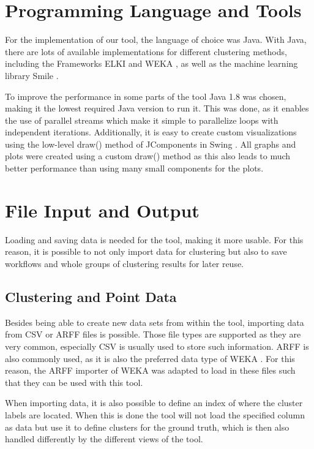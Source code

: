 \documentclass[
	a4paper,
	english,
	twoside,
	openright,               
	11pt                            
	]{report}
\begin{document}
\section{Programming Language and Tools}
For the implementation of our tool, the language of choice was Java. With Java, there are lots of available implementations for different clustering methods, including the Frameworks ELKI \cite{10.1007/978-3-540-69497-7_41} and WEKA \cite{10.1145/1656274.1656278}, as well as the machine learning library Smile \cite{javasmile}. 

To improve the performance in some parts of the tool Java 1.8 was chosen, making it the lowest required Java version to run it. This was done, as it enables the use of parallel streams which make it simple to parallelize loops with independent iterations. Additionally, it is easy to create custom visualizations using the low-level draw() method of JComponents in Swing \cite{javaswing}. All graphs and plots were created using a custom draw() method as this also leads to much better performance than using many small components for the plots.

\section{File Input and Output}
Loading and saving data is needed for the tool, making it more usable. For this reason, it is possible to not only import data for clustering but also to save workflows and whole groups of clustering results for later reuse.
\subsection{Clustering and Point Data}
Besides being able to create new data sets from within the tool, importing data from CSV or ARFF files is possible. Those file types are supported as they are very common, especially CSV is usually used to store such information. ARFF is also commonly used, as it is also the preferred data type of WEKA \cite{10.1145/1656274.1656278}. For this reason, the ARFF importer of WEKA was adapted to load in these files such that they can be used with this tool. 

When importing data, it is also possible to define an index of where the cluster labels are located. When this is done the tool will not load the specified column as data but use it to define clusters for the ground truth, which is then also handled differently by the different views of the tool.
\end{document}
